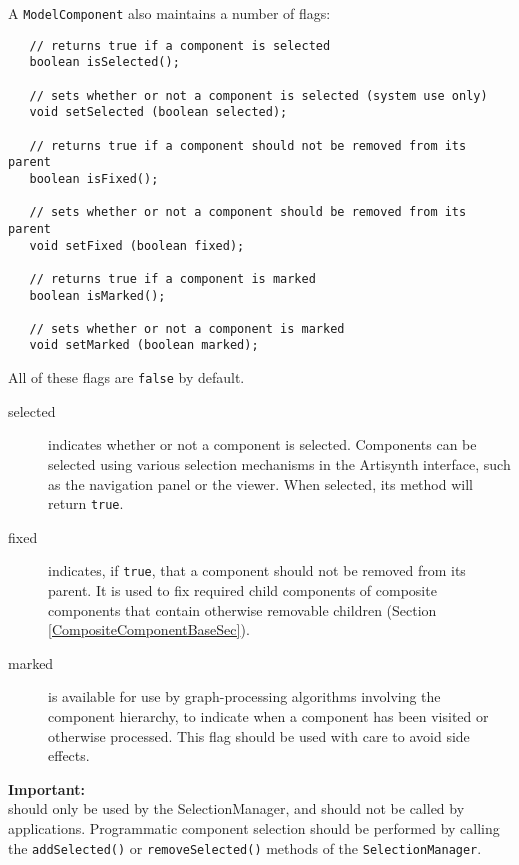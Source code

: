 \documentclass{article}
\begin{document}
A {\tt ModelComponent} also maintains a number of flags:
\begin{lstlisting}
   // returns true if a component is selected
   boolean isSelected();

   // sets whether or not a component is selected (system use only)
   void setSelected (boolean selected);

   // returns true if a component should not be removed from its parent
   boolean isFixed();

   // sets whether or not a component should be removed from its parent
   void setFixed (boolean fixed);

   // returns true if a component is marked
   boolean isMarked();

   // sets whether or not a component is marked
   void setMarked (boolean marked);
\end{lstlisting}

All of these flags are {\tt false} by default.

\begin{description}

\item [selected] indicates whether or not a component is selected.
Components can be selected using various selection mechanisms in
the Artisynth interface, such as the navigation panel or the viewer.
When selected, its  method
will return {\tt true}. 

\item [fixed] indicates, if {\tt true}, that a component should
not be removed from its parent. It is used to fix required child
components of composite components that contain otherwise removable
children (Section \ref{CompositeComponentBaseSec}).

\item [marked] is available for use by graph-processing
algorithms involving the component hierarchy, to indicate when a
component has been visited or otherwise processed. This flag should be
used with care to avoid side effects.

\end{description}

\begin{sideblock}
{\bf Important:}\\
 should only be used by the
SelectionManager, and should not be called by
applications. Programmatic component selection should be performed by
calling the {\tt addSelected()} or {\tt removeSelected()} methods of the
{\tt SelectionManager}.
\end{sideblock}
\end{document}
